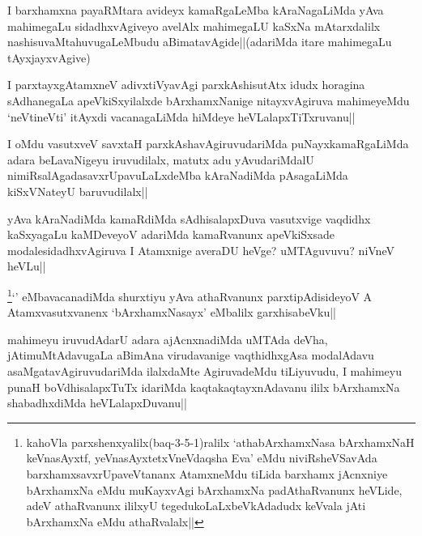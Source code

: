 
\begin{artha}
I barxhamxna payaRMtara avideyx kamaRgaLeMba kAraNagaLiMda yAva mahimegaLu sidadhxvAgiveyo avelAlx mahimegaLU kaSxNa mAtarxdalilx nashisuvaMtahuvugaLeMbudu aBimatavAgide||(adariMda itare mahimegaLu tAyxjayxvAgive)
\end{artha}

\begin{artha}
I parxtayxgAtamxneV adivxtiVyavAgi parxkAshisutAtx idudx horagina sAdhanegaLa apeVkiSxyilalxde bArxhamxNanige nitayxvAgiruva mahimeyeMdu `neVtineVti' itAyxdi vacanagaLiMda hiMdeye heVLalapxTiTxruvanu||
\end{artha}

\begin{artha}
I oMdu vasutxveV savxtaH parxkAshavAgiruvudariMda puNayxkamaRgaLiMda adara beLavaNigeyu iruvudilalx, matutx adu yAvudariMdalU nimiRsalAgadasavxrUpavuLaLxdeMba kAraNadiMda pAsagaLiMda kiSxVNateyU baruvudilalx||
\end{artha}



\begin{artha}
yAva kAraNadiMda kamaRdiMda sAdhisalapxDuva vasutxvige vaqdidhx kaSxyagaLu kaMDeveyoV adariMda kamaRvanunx apeVkiSxsade modalesidadhxvAgiruva I Atamxnige averaDU heVge? uMTAguvuvu? niVneV heVLu||
\end{artha}


\begin{artha}
\footnote{kahoVla parxshenxyalilx(baq-3-5-1)ralilx `athabArxhamxNasa bArxhamxNaH keVnasAyxtf, yeVnasAyxtetxVneVdaqsha Eva' eMdu niviRsheVSavAda barxhamxsavxrUpaveVtananx AtamxneMdu tiLida barxhamx jAcnxniye bArxhamxNa eMdu muKayxvAgi bArxhamxNa padAthaRvanunx heVLide, adeV athaRvanunx ililxyU tegedukoLaLxbeVkAdadudx keVvala jAti bArxhamxNa eMdu athaRvalalx||}`\stext' eMbavacanadiMda shurxtiyu yAva athaRvanunx parxtipAdisideyoV A Atamxvasutxvanenx `bArxhamxNasayx' eMbalilx garxhisabeVku||
\end{artha}


\begin{artha}
mahimeyu iruvudAdarU adara ajAcnxnadiMda uMTAda deVha, jAtimuMtAdavugaLa aBimAna virudavanige vaqthidhxgAsa modalAdavu asaMgatavAgiruvudariMda ilalxdaMte AgiruvadeMdu tiLiyuvudu, I mahimeyu punaH boVdhisalapxTuTx idariMda kaqtakaqtayxnAdavanu ililx bArxhamxNa shabadhxdiMda heVLalapxDuvanu||
\end{artha}

